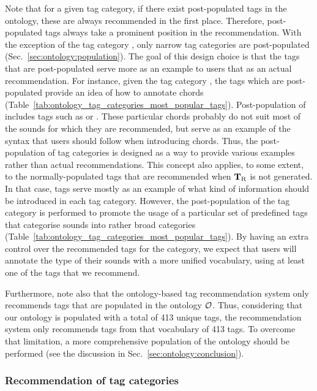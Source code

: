 Note that for a given tag category, if there exist post-populated tags in the ontology, these are always recommended in the first place.
Therefore, post-populated tags always take a prominent position in the recommendation. With the exception of the tag category , only narrow tag categories are post-populated (Sec.~\ref{sec:ontology:population}). The goal of this design choice is that the tags that are post-populated serve more as an example to users that as an actual recommendation. 
For instance, given the tag category , the tags which are post-populated provide an idea of how to annotate chords (Table~\ref{tab:ontology_tag_categories_most_popular_tags}). Post-population of  includes tags such as  or . These particular chords probably do not suit most of the sounds for which they are recommended, but serve as an example of the syntax that users should follow when introducing chords. Thus, the post-population of tag categories is designed as a way to provide various examples rather than actual recommendations.
This concept also applies, to some extent, to the normally-populated tags that are recommended when $\mathbf{T}_{\text{R}}$ is not generated. In that case, tags serve mostly as an example of what kind of information should be introduced in each tag category.
However, the post-population of the tag category  is performed to promote the usage of a particular set of predefined tags that categorise sounds into rather broad categories (Table~\ref{tab:ontology_tag_categories_most_popular_tags}). By having an extra control over the recommended tags for the  category, we expect that users will annotate the type of their sounds with a more unified vocabulary, using at least one of the tags that we recommend.

Furthermore, note also that the ontology-based tag recommendation system only recommends tags that are populated in the ontology $\mathcal{O}$. 
Thus, considering that our ontology is populated with a total of 413 unique tags, the recommendation system only recommends tags from that vocabulary of 413 tags. To overcome that limitation, a more comprehensive population of the ontology should be performed (see the discussion in Sec.~\ref{sec:ontology:conclusion}).


\subsubsection{Recommendation of tag categories}

